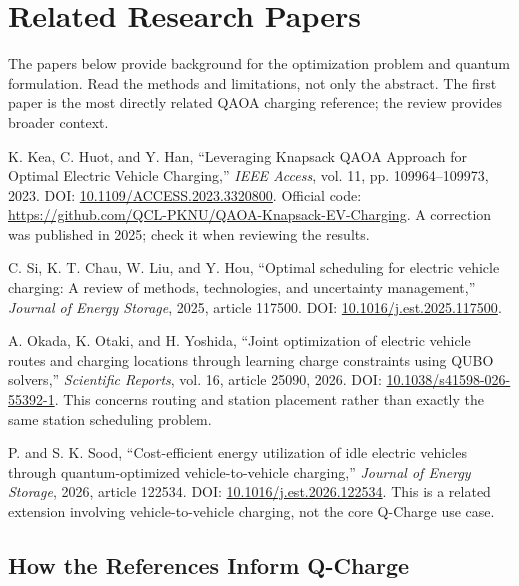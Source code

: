 \documentclass[11pt,a4paper]{article}
\begin{document}
\section{Related Research Papers}

The papers below provide background for the optimization problem and quantum formulation. Read the methods and limitations, not only the abstract. The first paper is the most directly related QAOA charging reference; the review provides broader context.

\begin{enumerate}[label={[R\arabic*]}]
  \item K. Kea, C. Huot, and Y. Han, ``Leveraging Knapsack QAOA Approach for Optimal Electric Vehicle Charging,'' \textit{IEEE Access}, vol. 11, pp. 109964--109973, 2023. DOI: \href{https://doi.org/10.1109/ACCESS.2023.3320800}{10.1109/ACCESS.2023.3320800}. Official code: \url{https://github.com/QCL-PKNU/QAOA-Knapsack-EV-Charging}. A correction was published in 2025; check it when reviewing the results.
  \item C. Si, K. T. Chau, W. Liu, and Y. Hou, ``Optimal scheduling for electric vehicle charging: A review of methods, technologies, and uncertainty management,'' \textit{Journal of Energy Storage}, 2025, article 117500. DOI: \href{https://doi.org/10.1016/j.est.2025.117500}{10.1016/j.est.2025.117500}.
  \item A. Okada, K. Otaki, and H. Yoshida, ``Joint optimization of electric vehicle routes and charging locations through learning charge constraints using QUBO solvers,'' \textit{Scientific Reports}, vol. 16, article 25090, 2026. DOI: \href{https://doi.org/10.1038/s41598-026-55392-1}{10.1038/s41598-026-55392-1}. This concerns routing and station placement rather than exactly the same station scheduling problem.
  \item P. and S. K. Sood, ``Cost-efficient energy utilization of idle electric vehicles through quantum-optimized vehicle-to-vehicle charging,'' \textit{Journal of Energy Storage}, 2026, article 122534. DOI: \href{https://doi.org/10.1016/j.est.2026.122534}{10.1016/j.est.2026.122534}. This is a related extension involving vehicle-to-vehicle charging, not the core Q-Charge use case.
\end{enumerate}

\subsection{How the References Inform Q-Charge}
\end{document}
